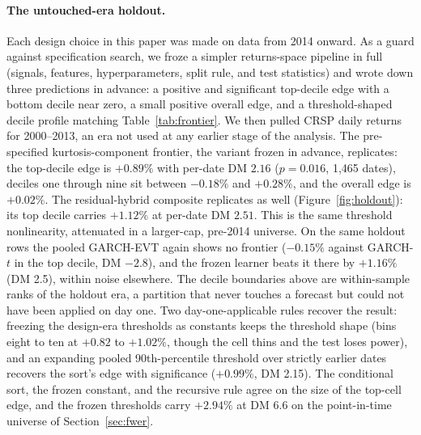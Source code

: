 \documentclass[11pt]{article}
\theoremstyle{remark}
\begin{document}
\paragraph{The untouched-era holdout.} Each design choice in this paper
was made on data from 2014 onward. As a guard against specification
search, we froze a simpler returns-space pipeline in full (signals, features,
hyperparameters, split rule, and test statistics) and wrote down three
predictions in advance: a positive and significant top-decile edge with
a bottom decile near zero, a small positive overall edge, and a
threshold-shaped decile profile matching Table~\ref{tab:frontier}. We then pulled CRSP daily returns for 2000--2013, an
era not used at any earlier stage of the analysis. The pre-specified kurtosis-component frontier, the variant frozen in advance, replicates: the top-decile edge is $+0.89\%$ with per-date DM $2.16$ ($p=0.016$, 1{,}465 dates), deciles one through nine sit between $-0.18\%$ and $+0.28\%$, and the overall edge is $+0.02\%$. The residual-hybrid composite replicates as well (Figure~\ref{fig:holdout}): its top decile carries $+1.12\%$ at per-date DM $2.51$. This is the same threshold nonlinearity, attenuated in a larger-cap, pre-2014 universe. On the same holdout rows the pooled GARCH-EVT again shows no frontier ($-0.15\%$ against GARCH-$t$ in the top decile, DM $-2.8$), and the frozen learner beats it there by $+1.16\%$ (DM 2.5), within noise elsewhere.
The decile boundaries above are within-sample ranks of the holdout era,
a partition that never touches a forecast but could not have been applied
on day one. Two day-one-applicable rules recover the result: freezing the
design-era thresholds as constants keeps the threshold shape (bins eight
to ten at $+0.82$ to $+1.02\%$, though the cell thins and the test loses
power), and an expanding pooled 90th-percentile threshold over strictly
earlier dates recovers the sort's edge with significance ($+0.99\%$, DM
2.15). The conditional sort, the frozen constant, and the recursive rule
agree on the size of the top-cell edge, and the frozen thresholds carry
$+2.94\%$ at DM 6.6 on the point-in-time universe of
Section~\ref{sec:fwer}.
\end{document}
